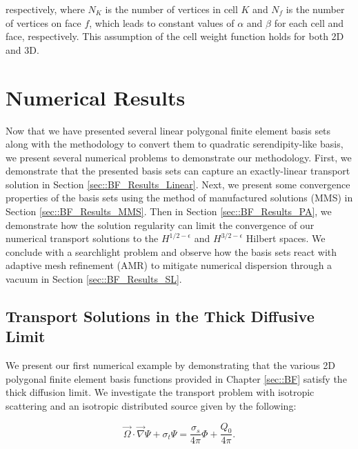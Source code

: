 \noindent respectively, where $N_K$ is the number of vertices in cell $K$ and $N_f$ is the number of vertices on face $f$, which leads to constant values of $\alpha$ and $\beta$ for each cell and face, respectively. This assumption of the cell weight function holds for both 2D and 3D.



\section{Numerical Results}
\label{sec::BF_Results}

Now that we have presented several linear polygonal finite element basis sets along with the methodology to convert them to quadratic serendipity-like basis, we present several numerical problems to demonstrate our methodology. First, we demonstrate that the presented basis sets can capture an exactly-linear transport solution in Section \ref{sec::BF_Results_Linear}. Next, we present some convergence properties of the basis sets using the method of manufactured solutions (MMS) in Section \ref{sec::BF_Results_MMS}. Then in Section \ref{sec::BF_Results_PA}, we demonstrate how the solution regularity can limit the convergence of our numerical transport solutions to the $H^{1/2-\epsilon}$ and $H^{3/2-\epsilon}$ Hilbert spaces. We conclude with a searchlight problem and observe how the basis sets react with adaptive mesh refinement (AMR) to mitigate numerical dispersion through a vacuum in Section \ref{sec::BF_Results_SL}.

\subsection{Transport Solutions in the Thick Diffusive Limit}
\label{sec::DSA_Results_TDL}

We present our first numerical example by demonstrating that the various 2D polygonal finite element basis functions provided in Chapter \ref{sec::BF} satisfy the thick diffusion limit. We investigate the transport problem with isotropic scattering and an isotropic distributed source given by the following:

\begin{equation}
\label{eq::BF_Results_TDL_trans_eq}
\vec{\Omega} \cdot \vec{\nabla} \Psi + \sigma_t \Psi =   \frac{\sigma_s}{4 \pi} \Phi +  \frac{Q_0}{4 \pi}.
\end{equation}

